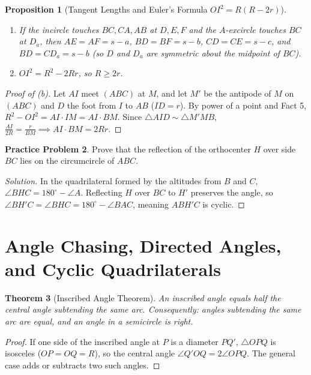 \documentclass[11pt]{article}
\theoremstyle{plain}
\newtheorem{theorem}{Theorem}[section]
\newtheorem{proposition}[theorem]{Proposition}
\theoremstyle{definition}
\newtheorem{problem}[theorem]{Practice Problem}
\newenvironment{solution}{\begin{proof}[Solution]}{\end{proof}}
\begin{document}
\begin{proposition}[Tangent Lengths and Euler's Formula $OI^2 = R(R-2r)$]
\leavevmode
\begin{enumerate}[label=(\alph*)]
\item If the incircle touches $BC, CA, AB$ at $D, E, F$ and the $A$-excircle touches $BC$ at $D_a$, then $AE=AF=s-a$, $BD=BF=s-b$, $CD=CE=s-c$, and $BD = CD_a = s-b$ (so $D$ and $D_a$ are symmetric about the midpoint of $BC$).
\item $OI^2 = R^2 - 2Rr$, so $R \ge 2r$.
\end{enumerate}
\end{proposition}
\begin{proof}[Proof of (b)]
Let $AI$ meet $(ABC)$ at $M$, and let $M'$ be the antipode of $M$ on $(ABC)$ and $D$ the foot from $I$ to $AB$ ($ID=r$). By power of a point and Fact 5, $R^2 - OI^2 = AI \cdot IM = AI \cdot BM$. Since $\triangle AID \sim \triangle M'MB$, $\frac{AI}{2R} = \frac{r}{BM} \implies AI \cdot BM = 2Rr$.
\end{proof}

\begin{problem}
Prove that the reflection of the orthocenter $H$ over side $BC$ lies on the
circumcircle of $ABC$.
\end{problem}
\begin{solution}
In the quadrilateral formed by the altitudes from $B$ and $C$, $\angle BHC = 180^\circ - \angle A$.
Reflecting $H$ over $BC$ to $H'$ preserves the angle, so
$\angle BH'C = \angle BHC = 180^\circ - \angle BAC$, meaning $ABH'C$ is cyclic.
\end{solution}

\section{Angle Chasing, Directed Angles, and Cyclic Quadrilaterals}

\begin{theorem}[Inscribed Angle Theorem]
An inscribed angle equals half the central angle subtending the same arc.
Consequently: angles subtending the same arc are equal, and an angle in a
semicircle is right.
\end{theorem}
\begin{proof}
If one side of the inscribed angle at $P$ is a diameter $PQ'$, $\triangle OPQ$ is isosceles ($OP=OQ=R$), so the central angle $\angle Q'OQ = 2\angle OPQ$. The general case adds or subtracts two such angles.
\end{proof}
\end{document}
